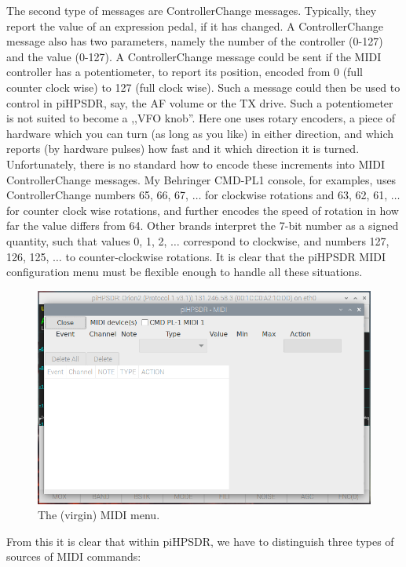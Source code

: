 \documentclass[12pt]{book}
\begin{document}
The second type of messages are ControllerChange messages. Typically, they report the value of
an expression pedal, if it has changed. A ControllerChange message also has two parameters,
namely the number of the controller (0-127) and the value (0-127). A ControllerChange
message could be sent if the MIDI controller has a potentiometer, to report its position,
encoded from 0 (full counter clock wise) to 127 (full clock wise). Such a message could then be
used to control in piHPSDR, say, the AF volume or the TX drive. Such a potentiometer is
not suited to become a ,,VFO knob''. Here one uses rotary encoders, a piece of hardware which
you can turn (as long as you like) in either direction, and which reports (by hardware pulses)
how fast and it which direction it is turned. Unfortunately, there is no standard how to
encode these increments into MIDI ControllerChange messages. My Behringer CMD-PL1 console,
for examples, uses ControllerChange numbers 65, 66, 67, $\ldots$ for clockwise rotations
and 63, 62, 61, $\ldots$ for counter clock wise rotations, and further encodes the speed of
rotation in how far the value differs from 64. Other brands interpret the 7-bit number
as a signed quantity, such that values 0, 1, 2, $\ldots$ correspond to clockwise,
and numbers 127, 126, 125, $\ldots$ to counter-clockwise rotations. It is clear that
the piHPSDR MIDI configuration menu must be flexible enough to handle all these situations.

\begin{figure}[ht]
\center
\includegraphics[width=12cm]{MIDImenu1.png}
\caption{The (virgin) MIDI menu.}
\label{fig:MIDImenu1}
\end{figure}

From this it is clear that within piHPSDR, we have to distinguish three types of sources
of MIDI commands:
\end{document}

